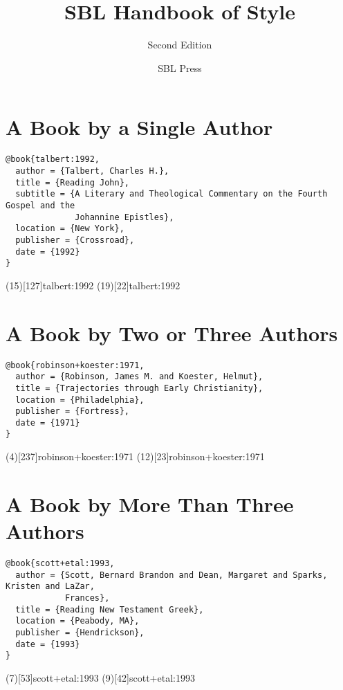 \documentclass[a4paper]{article}
\begin{document}
\title{SBL Handbook of Style}
\author{Second Edition}
\date{SBL Press}
\maketitle

\tableofcontents

\section{A Book by a Single Author}

\begin{verbatim}
@book{talbert:1992,
  author = {Talbert, Charles H.},
  title = {Reading John},
  subtitle = {A Literary and Theological Commentary on the Fourth Gospel and the
              Johannine Epistles},
  location = {New York},
  publisher = {Crossroad},
  date = {1992}
}
\end{verbatim}

\examplecite(15)[127]{talbert:1992}
\examplecite(19)[22]{talbert:1992}
\examplebibliography

\section{A Book by Two or Three Authors}

\begin{verbatim}
@book{robinson+koester:1971,
  author = {Robinson, James M. and Koester, Helmut},
  title = {Trajectories through Early Christianity},
  location = {Philadelphia},
  publisher = {Fortress},
  date = {1971}
}
\end{verbatim}

\examplecite(4)[237]{robinson+koester:1971}
\examplecite(12)[23]{robinson+koester:1971}
\examplebibliography

\section{A Book by More Than Three Authors}

\begin{verbatim}
@book{scott+etal:1993,
  author = {Scott, Bernard Brandon and Dean, Margaret and Sparks, Kristen and LaZar,
            Frances},
  title = {Reading New Testament Greek},
  location = {Peabody, MA},
  publisher = {Hendrickson},
  date = {1993}
}
\end{verbatim}

\examplecite(7)[53]{scott+etal:1993}
\examplecite(9)[42]{scott+etal:1993}
\examplebibliography
\end{document}
